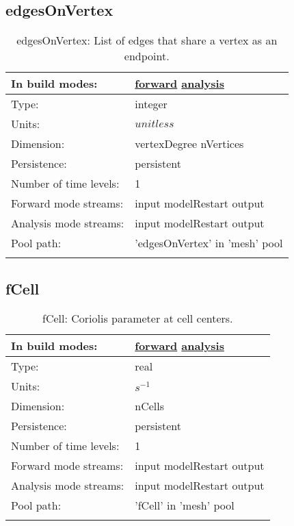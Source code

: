 \subsection[edgesOnVertex]{edgesOnVertex}
\label{subsec:var_sec_mesh_edgesOnVertex}
\begin{center}
\begin{longtable}{| p{2.0in} | p{4.0in} |}
        \hline 
        In build modes: & \hyperref[subsec:forward_var_tab_mesh]{forward} \hyperref[subsec:analysis_var_tab_mesh]{analysis} \\
        \hline 
        Type: & integer \\
        \hline 
        Units: & $unitless$ \\
        \hline 
        Dimension: & vertexDegree nVertices \\
        \hline 
        Persistence: & persistent \\
        \hline 
        Number of time levels: & 1 \\
        \hline 
		 Forward mode streams: &  input modelRestart output \\
        \hline 
		 Analysis mode streams: &  input modelRestart output \\
        \hline 
            Pool path: & 'edgesOnVertex' in 'mesh' pool
 \\
		 \hline 
    \caption{edgesOnVertex: List of edges that share a vertex as an endpoint.}
\end{longtable}
\end{center}
\subsection[fCell]{fCell}
\label{subsec:var_sec_mesh_fCell}
\begin{center}
\begin{longtable}{| p{2.0in} | p{4.0in} |}
        \hline 
        In build modes: & \hyperref[subsec:forward_var_tab_mesh]{forward} \hyperref[subsec:analysis_var_tab_mesh]{analysis} \\
        \hline 
        Type: & real \\
        \hline 
        Units: & $s^{-1}$ \\
        \hline 
        Dimension: & nCells \\
        \hline 
        Persistence: & persistent \\
        \hline 
        Number of time levels: & 1 \\
        \hline 
		 Forward mode streams: &  input modelRestart output \\
        \hline 
		 Analysis mode streams: &  input modelRestart output \\
        \hline 
            Pool path: & 'fCell' in 'mesh' pool
 \\
		 \hline 
    \caption{fCell: Coriolis parameter at cell centers.}
\end{longtable}
\end{center}
